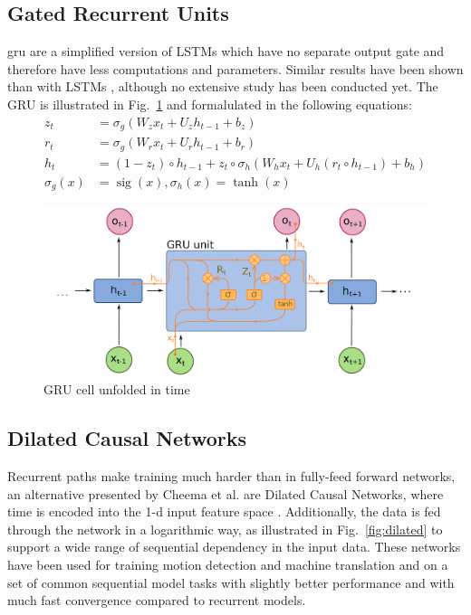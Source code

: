 \subsection{Gated Recurrent Units}
\gls{gru} are a simplified version of LSTMs which have no separate output gate and therefore have less computations and parameters. Similar results have been shown than with LSTMs \cite{bahdanau2014neural}, although no extensive study has been conducted yet. The GRU is illustrated in Fig.~\ref{fig:gru} and formalulated in the following equations:
\begin{align*}
z_t &= \sigma_g(W_{z} x_t + U_{z} h_{t-1} + b_z) \\
r_t &= \sigma_g(W_{r} x_t + U_{r} h_{t-1} + b_r) \\
h_t &=  (1 - z_t) \circ h_{t-1} + z_t \circ \sigma_h(W_{h} x_t + U_{h} (r_t \circ h_{t-1}) + b_h)\\
\sigma_g(x) &= \operatorname{sig}(x), \sigma_h(x) = \operatorname{tanh}(x) 
\end{align*}

\begin{figure}[ht]
    \centering
    \includegraphics[width=\textwidth]{figures/gru.png}
    \caption{GRU cell unfolded in time \cite{wikimediaGru}}
    \label{fig:gru}
\end{figure}

\subsection{Dilated Causal Networks}
Recurrent paths make training much harder than in fully-feed forward networks, an alternative presented by Cheema et al. are Dilated Causal Networks, where time is encoded into the 1-d input feature space \cite{cheema2018dilated}. Additionally, the data is fed through the network in a logarithmic way, as illustrated in Fig.~\ref{fig:dilated} to support a wide range of sequential dependency in the input data. These networks have been used for training motion detection \cite{cheema2018dilated} and machine translation \cite{kalchbrenner2016neural} and on a set of common sequential model tasks \cite{bai2018empirical} with slightly better performance and with much fast convergence compared to recurrent models.

